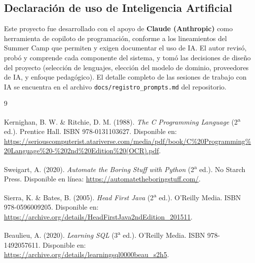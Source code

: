\documentclass[11pt,letterpaper]{article}
\begin{document}
\subsection*{Declaración de uso de Inteligencia Artificial}
Este proyecto fue desarrollado con el apoyo de \textbf{Claude
(Anthropic)} como herramienta de copiloto de programación, conforme a
los lineamientos del Summer Camp que permiten y exigen documentar el
uso de IA. El autor revisó, probó y comprende cada componente del
sistema, y tomó las decisiones de diseño del proyecto (selección de
lenguajes, elección del modelo de dominio, proveedores de IA, y
enfoque pedagógico). El detalle completo de las sesiones de trabajo
con IA se encuentra en el archivo \texttt{docs/registro\_prompts.md}
del repositorio.

\begin{thebibliography}{9}

Kernighan, B. W. \& Ritchie, D. M. (1988).
\textit{The C Programming Language} (2\textsuperscript{a} ed.).
Prentice Hall. ISBN 978-0131103627. Disponible en:
\url{https://seriouscomputerist.atariverse.com/media/pdf/book/C\%20Programming\%20Language\%20-\%202nd\%20Edition\%20(OCR).pdf}.

Sweigart, A. (2020).
\textit{Automate the Boring Stuff with Python} (2\textsuperscript{a} ed.).
No Starch Press. Disponible en línea:
\url{https://automatetheboringstuff.com/}.

Sierra, K. \& Bates, B. (2005).
\textit{Head First Java} (2\textsuperscript{a} ed.).
O'Reilly Media. ISBN 978-0596009205. Disponible en:
\url{https://archive.org/details/HeadFirstJava2ndEdition_201511}.

Beaulieu, A. (2020).
\textit{Learning SQL} (3\textsuperscript{a} ed.).
O'Reilly Media. ISBN 978-1492057611. Disponible en:
\url{https://archive.org/details/learningsql0000beau_s2h5}.

\end{thebibliography}
\end{document}
